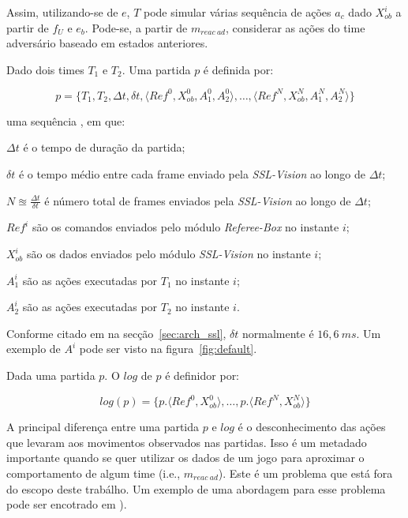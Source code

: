  Assim, utilizando-se de $e$, $T$ pode simular várias sequência de ações $a_c$ dado $X_{ob}^{i}$
  a partir de $f_{U}$ e $e_b$. Pode-se, a partir de $m_{reac{\ }ad}$, considerar as ações do time
  adversário baseado em estados anteriores.

\begin{defi}[Partida]
  Dado dois times $T_1$ e $T_2$. Uma partida $p$ é definida por:

  \[
   p = \lbrace T_1, T_2, \Delta t, \delta t, \langle Ref^{0}, X_{ob}^{0}, A_1^{0}, A_2^{0}\rangle, 
    \dots, \langle Ref^{N}, X_{ob}^{N}, A_1^{N}, A_2^{N} \rangle \rbrace
 \]

  uma sequência , em que:
  \begin{description}
    \item $\Delta t$ é o tempo de duração da partida;
    \item $\delta t$ é o tempo médio entre cada frame enviado pela \textit{SSL-Vision} ao longo de $\Delta t$;
    \item $N \approxeq \frac{\Delta t}{\delta t}$ é número total de frames enviados pela \textit{SSL-Vision}
  ao longo de $\Delta t$;
    \item $Ref^{i}$ são os comandos enviados pelo módulo \textit{Referee-Box} no instante $i$;
    \item $X_{ob}^{i}$ são os dados enviados pelo módulo \textit{SSL-Vision} no instante $i$;
    \item $A_1^{i}$ são as ações executadas por $T_1$ no instante $i$;
    \item $A_2^{i}$ são as ações executadas por $T_2$ no instante $i$.
  \end{description}
\end{defi}

  Conforme citado em na secção~\ref{sec:arch_ssl}, $\delta t$ normalmente é $16,6{\ }ms$.
  Um exemplo de $A^{i}$ pode ser visto na figura~\ref{fig:default}.

\begin{defi}[Logs]
  Dada uma partida $p$. O $log$ de $p$ é definidor por:

  \[
    log(p) = \lbrace p.\langle Ref^{0}, X_{ob}^{0}\rangle, \dots, p.\langle Ref^{N}, X_{ob}^{N}\rangle \rbrace
  \]
\end{defi}
 
  A principal diferença entre uma partida $p$ e $log$ é o desconhecimento das ações que levaram
  aos movimentos observados nas partidas. Isso é um metadado importante quando se quer utilizar
  os dados de um jogo para aproximar o comportamento de algum time (i.e., $m_{reac{\ }ad}$).
  Este é um problema que está fora do escopo deste trabálho. Um exemplo de uma abordagem para
  esse problema pode ser encotrado em \cite{vail2008crf}).

